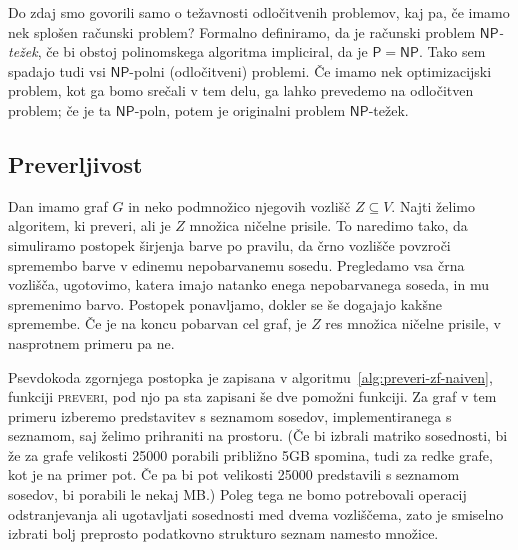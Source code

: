 \documentclass[12pt,a4paper,twoside]{article}
\theoremstyle{definition} %
\theoremstyle{plain} %
\numberwithin{equation}{section}  %
\renewcommand{\P}{\ensuremath{\mathsf{P}}}
\newcommand{\NP}{\ensuremath{\mathsf{NP}}}
\begin{document}
Do zdaj smo govorili samo o težavnosti odločitvenih problemov, kaj pa, če imamo nek splošen računski problem? Formalno definiramo, da je računski problem \emph{$\NP$-težek}, če bi obstoj polinomskega algoritma impliciral, da je $\P = \NP$. Tako sem spadajo tudi vsi $\NP$-polni (odločitveni) problemi. Če imamo nek optimizacijski problem, kot ga bomo srečali v tem delu, ga lahko prevedemo na odločitven problem; če je ta $\NP$-poln, potem je originalni problem $\NP$-težek.

\subsection{Preverljivost}
Dan imamo graf $G$ in neko podmnožico njegovih vozlišč $Z \subseteq V$. Najti želimo algoritem, ki preveri, ali je $Z$ množica ničelne prisile. To naredimo tako, da simuliramo postopek širjenja barve po pravilu, da črno vozlišče povzroči spremembo barve v edinemu nepobarvanemu sosedu. Pregledamo vsa črna vozlišča, ugotovimo, katera imajo natanko enega nepobarvanega soseda, in mu spremenimo barvo. Postopek ponavljamo, dokler se še dogajajo kakšne spremembe. Če je na koncu pobarvan cel graf, je $Z$ res množica ničelne prisile, v nasprotnem primeru pa ne. 

Psevdokoda zgornjega postopka je zapisana v algoritmu~\ref{alg:preveri-zf-naiven}, funkciji \textsc{preveri}, pod njo pa sta zapisani še dve pomožni funkciji. Za graf v tem primeru izberemo predstavitev s seznamom sosedov, implementiranega s seznamom, saj želimo prihraniti na prostoru. (Če bi izbrali matriko sosednosti, bi že za grafe velikosti 25000 porabili približno 5GB spomina, tudi za redke grafe, kot je na primer pot. Če pa bi pot velikosti 25000 predstavili s seznamom sosedov, bi porabili le nekaj MB.) Poleg tega ne bomo potrebovali operacij odstranjevanja ali ugotavljati sosednosti med dvema vozliščema, zato je smiselno izbrati bolj preprosto podatkovno strukturo seznam namesto množice. 
\end{document}
